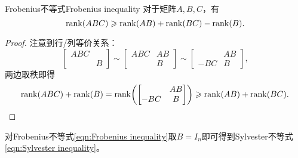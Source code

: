 \begin{theorem}{Frobenius不等式}{Frobenius inequality}
	对于矩阵$A,B,C$，有
	\begin{equation}
		\label{eqn:Frobenius inequality}
		\operatorname{rank}(ABC)\geqslant\operatorname{rank}(AB)+\operatorname{rank}(BC)-\operatorname{rank}(B).
	\end{equation}
\end{theorem}
\begin{proof}
	注意到行/列等价关系：
	\[
		\begin{bmatrix}
			ABC\\ &B
		\end{bmatrix}\sim\begin{bmatrix}
			ABC&AB\\ &B
		\end{bmatrix}\sim\begin{bmatrix}
			&AB\\-BC&B
		\end{bmatrix},
	\]
	两边取秩即得
	\[
		\operatorname{rank}(ABC)+\operatorname{rank}(B)=\operatorname{rank}\biggl(\begin{bmatrix}
			&AB\\-BC&B
		\end{bmatrix}\biggr)\geqslant\operatorname{rank}(AB)+\operatorname{rank}(BC).
		\qedhere
	\]
\end{proof}

\begin{corollary}
	对Frobenius不等式\eqref{eqn:Frobenius inequality}取$B=I_n$即可得到Sylvester不等式\eqref{eqn:Sylvester inequality}。
\end{corollary}

